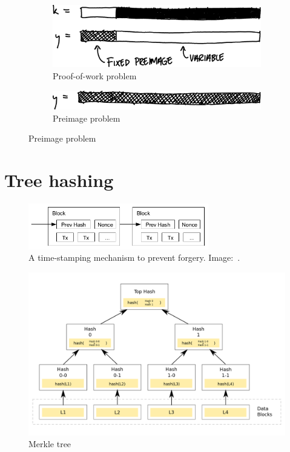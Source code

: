 \begin{frame}
  \begin{figure}
    \begin{subfigure}{0.8\columnwidth}
      \includegraphics[width=\columnwidth]{fig/pow.pdf}
      \caption{Proof-of-work problem}
    \end{subfigure}
    \vfill
    \begin{subfigure}{0.8\columnwidth}
      \includegraphics[width=\columnwidth]{fig/preimage.pdf}
      \caption{Preimage problem}
    \end{subfigure}
  \end{figure}
\end{frame}

\section{Tree hashing}

\begin{frame}
  \begin{figure}
    \includegraphics[width=0.7\textwidth]{fig/bitcoin-pow.png}
    \caption{A time-stamping mechanism to prevent forgery.
    Image:~\cite{Nakamoto2008bap}.}
  \end{figure}
\end{frame}

\begin{frame}
  \begin{figure}
    \includegraphics[width=0.9\columnwidth]{fig/merkle-tree.png}
    \caption{Merkle tree}
  \end{figure}
\end{frame}

